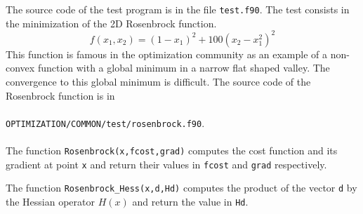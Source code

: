 \documentclass[a4paper,twoside,final,onecolumn,11pt,openright]{article}
\begin{document}
\vspace{0.5cm}

The source code of the test program is in the file \texttt{test.f90}. The test consists in the minimization of the 2D Rosenbrock function. 
\begin{equation}
 f(x_1,x_2)  = (1-x_1)^2+100(x_2-x_1^2)^2
\end{equation}
This function is famous in the optimization community as an example of a non-convex function with a global minimum in a narrow flat shaped valley. The convergence to this global minimum is difficult. The source code of the Rosenbrock function is in
\\
\\
\texttt{OPTIMIZATION/COMMON/test/rosenbrock.f90}. 
\\
\\
The function \texttt{Rosenbrock(x,fcost,grad)} computes the cost function and its gradient at point \texttt{x} and return their values in \texttt{fcost} and \texttt{grad} respectively. 

The function \texttt{Rosenbrock\_Hess(x,d,Hd)} computes the product of the vector \texttt{d} by the Hessian operator $H(x)$ and return the value in \texttt{Hd}. 

\vspace{0.5cm}
\end{document}
